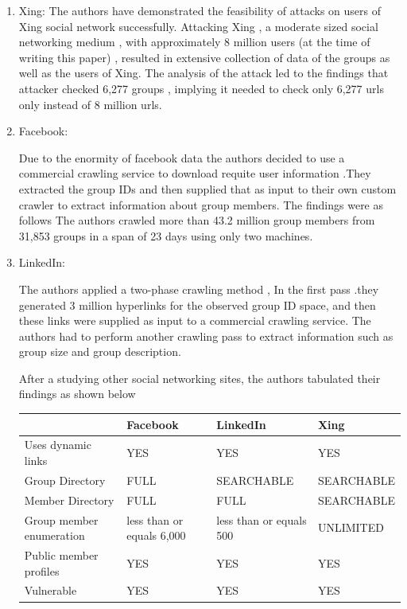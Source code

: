 \documentclass{article}
\begin{document}
\begin{enumerate}

\item  Xing: 
The authors have demonstrated the feasibility of attacks on users of Xing social network successfully. Attacking  Xing , a moderate sized social networking medium , with approximately 8 million users (at the time of writing this paper) , resulted in extensive collection of data of the groups as well as the users of Xing. The analysis of the attack led to the findings that attacker checked 6,277 groups , implying it needed to check only 6,277 urls only instead of 8 million urls.

\item Facebook:

 Due to the enormity of facebook data the authors  decided to use a commercial crawling service to download requite user information .They extracted the group IDs and then supplied that as input to their own custom crawler to extract information about group members. The findings were as follows
The authors crawled more than  43.2 million group members from 31,853 groups in a span of 23 days using only two machines.

\item LinkedIn: 

The authors applied a  two-phase crawling method , In the first pass .they  generated 3 million hyperlinks for the observed group ID space, and then these links were supplied as input to a commercial crawling service. The authors had to perform another  crawling pass to extract information such as  group size and group description.

After a studying other social networking sites, the authors tabulated their findings as shown below


\begin{center}
\begin{tabular}{ |p{3cm}||p{3cm}||p{3cm}||p{3cm}| }
\hline
     &  Facebook& LinkedIn & Xing  \\ 
\hline
Uses dynamic links &  YES & YES & YES  \\ 
\hline
Group Directory &  FULL & SEARCHABLE & SEARCHABLE  \\ 
\hline
Member Directory &  FULL & FULL & SEARCHABLE  \\ 
\hline
Group member enumeration &  less than or equals 6,000 & less than or equals 500 & UNLIMITED  \\ 
\hline
Public member profiles &  YES & YES & YES  \\ 
\hline
Vulnerable &  YES & YES & YES  \\ 
\hline

\end{tabular}
\end{center}

\end{enumerate}
\end{document}
